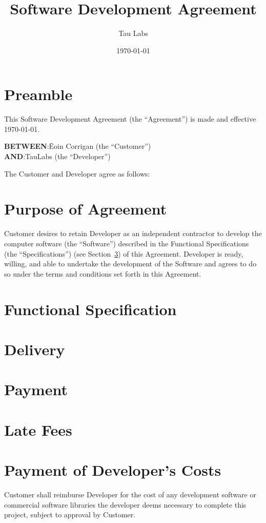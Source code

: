 \documentclass{article}
\begin{document}
\title{Software Development Agreement}
\author{Tau Labs}
\date{\today}
\maketitle
\section{Preamble}
This Software Development Agreement (the “Agreement”) is made and effective {\today}.
\begin{tabbing}
{\bf BETWEEN}:\hspace{0.2in}\=Eoin Corrigan (the “Customer”) \\
{\bf AND}:\>TauLabs (the “Developer”) 
\end{tabbing}
The Customer and Developer agree as follows:
\section{Purpose of Agreement}
Customer desires to retain Developer as an independent contractor to develop the computer software (the “Software”) described in the Functional Specifications (the “Specifications”) (see Section~\ref{sec:functionalspec}) of this Agreement. Developer is ready, willing, and able to undertake the development of the Software and agrees to do so under the terms and conditions set forth in this Agreement.
\section{Functional Specification}
\label{sec:functionalspec}
\section{Delivery}
\section{Payment}	
\section{Late Fees}
\section{Payment of Developer’s Costs}
Customer shall reimburse Developer for the cost of any development software or commercial software libraries the developer deems necessary to complete this project, subject to approval by Customer.
\end{document}
